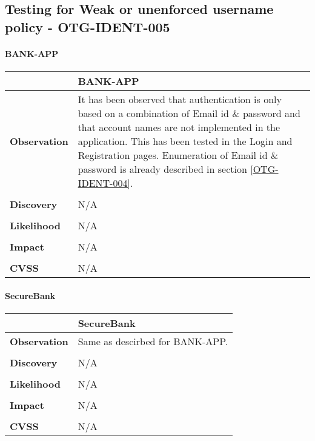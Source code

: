\subsection{Testing for Weak or unenforced username policy - OTG-IDENT-005}

\paragraph{BANK-APP} \mbox{}
\begin{longtable*}{p{.20\textwidth} | p{.80\textwidth}}
    \hline
    & \textbf{BANK-APP} \\
    \hline
    \textbf{Observation} &
	It has been observed that authentication is only based on a combination of Email id \& password and that account names are not implemented in the application. This has been tested in the Login and Registration pages. 
	Enumeration of Email id \& password is already described in section \ref{OTG-IDENT-004}.
    \\\\
    \textbf{Discovery} &
      N/A
     \\\\
    \textbf{Likelihood} &
        N/A
    \\\\
    \textbf{Impact} &
       N/A
    \\\\
    \textbf{CVSS} &
     N/A
    \\
    \hline
\end{longtable*}
\paragraph{SecureBank} \mbox{}
\begin{longtable*}{p{.20\textwidth} | p{.80\textwidth}}
    \hline
    & \textbf{SecureBank} \\
    \hline
    \textbf{Observation} &
       Same as descirbed for BANK-APP.
    \\\\
    \textbf{Discovery} &
        N/A
    \\\\
    \textbf{Likelihood} &
        N/A
    \\\\
    \textbf{Impact} &
        N/A
    \\\\
    \textbf{CVSS} &
        N/A
    \\
    \hline
\end{longtable*}
\clearpage